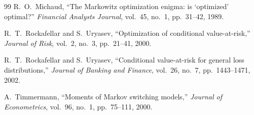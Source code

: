 \documentclass[12pt,oneside]{book}
\begin{document}
\begin{thebibliography}{99}
 R.\ O.\ Michaud, ``The Markowitz optimization enigma: is `optimized' optimal?'' \textit{Financial Analysts Journal}, vol.\ 45, no.\ 1, pp.\ 31--42, 1989.

 R.\ T.\ Rockafellar and S.\ Uryasev, ``Optimization of conditional value-at-risk,'' \textit{Journal of Risk}, vol.\ 2, no.\ 3, pp.\ 21--41, 2000.

 R.\ T.\ Rockafellar and S.\ Uryasev, ``Conditional value-at-risk for general loss distributions,'' \textit{Journal of Banking and Finance}, vol.\ 26, no.\ 7, pp.\ 1443--1471, 2002.

 A.\ Timmermann, ``Moments of Markov switching models,'' \textit{Journal of Econometrics}, vol.\ 96, no.\ 1, pp.\ 75--111, 2000.

\end{thebibliography}
\end{document}
